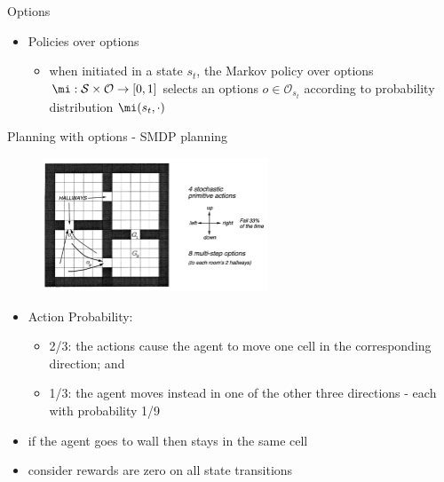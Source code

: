 \begin{frame}{Options}
    \begin{itemize}
        \item Policies over options
        \begin{itemize}
            \item when initiated in a state $s_t$, the Markov policy over options $\mi: \mathcal{S} \times \mathcal{O} \rightarrow [0,1]$ selects an options $o \in \mathcal{O}_s_t$ according to probability distribution $\mi(s_t,\cdot)$
        \end{itemize}
    \end{itemize}
\end{frame}

\begin{frame}{Planning with options - SMDP planning}
    \begin{figure}
        \centering
        \includegraphics[width=0.6\textwidth]{img/planningOptions.png}
        \label{figPlanningOptions}
    \end{figure}
    \begin{itemize}
        \item Action Probability:
        \begin{itemize}
            \item 2/3: the actions cause the agent to move one cell in the corresponding direction; and
            \item 1/3: the agent moves instead in one of the other three directions - each with probability 1/9
        \end{itemize}
        \item if the agent goes to wall then stays in the same cell
        \item consider rewards are zero on all state transitions
    \end{itemize}
\end{frame}

